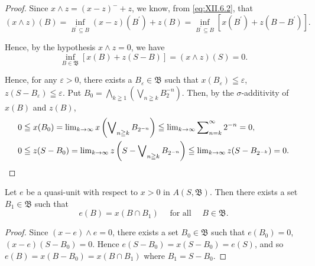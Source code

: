 \begin{proof}
 Since $x \wedge z = (x - z)^{-} + z$, we know, from \eqref{eq:XII.6.2}, that 
\begin{equation}\label{eq:XII.6.3}
(x \wedge z) (B) = \inf\limits _ {B ^{\prime} \subseteq B} (x - z) \left(B ^{\prime}\right) + z (B) = \inf\limits _ {B ^{\prime} \subseteq B} \left[ x \left(B ^{\prime}\right) + z \left(B - B ^{\prime}\right) \right]. \end{equation}

Hence, by the hypothesis $x \wedge z = 0$, we have 
\[
\inf\limits _ {B \in \mathfrak {B}} [ x (B) + z (S - B) ] = (x \wedge z) (S) = 0.
\]

Hence, for any $\varepsilon > 0$, there exists a $B_{\varepsilon} \in \mathfrak{B}$ such that $x(B_{\varepsilon}) \leqq \varepsilon$, $z(S - B_{\varepsilon}) \leqq \varepsilon$. Put $B_0 = \bigwedge\limits_{k \geqq 1} \left( \bigvee\limits_{n \geqq k} B_2^{-n} \right)$. Then, by the $\sigma$-additivity of $x(B)$ and $z(B)$, 
\begin{align}
0& \leqq x (B _{0}) = \lim\limits _{k \rightarrow \infty} x \left(\bigvee\limits_{n \geqq k} B _ {2 ^{-n}}\right) \leqq \lim\limits _{k \rightarrow \infty} \sum\limits_{n=k} ^{\infty} 2 ^{-n} = 0, \notag \\
0& \leqq z (S - B _{0}) = \lim\limits _{k \rightarrow \infty} z \left(S - \bigvee\limits_{n \geqq k} B _ {2 ^{-n}}\right) \leqq \lim\limits _{k \rightarrow \infty} z (S - B _ {2 ^{-k}}) = 0. \notag
\end{align}
\end{proof}

\begin{corollaryu} Let $e$ be a quasi-unit with respect to $x > 0$ in $A(S, \mathfrak{B})$. Then there exists a set $B_{1} \in \mathfrak{B}$ such that 
\begin{equation}\label{eq:XII.6.4}
e (B) = x \left(B \cap B _{1}\right) \quad \text{ for all } \quad B \in \mathfrak {B}.
\end{equation}
\end{corollaryu}

\begin{proof}
 Since $(x - e) \wedge e = 0$, there exists a set $B_0 \in \mathfrak{B}$ such that $e(B_0) = 0$, $(x - e)(S - B_0) = 0$. Hence $e(S - B_0) = x(S - B_0) = e(S)$, and so $e(B) = x(B - B_0) = x(B \cap B_1)$ where $B_1 = S - B_0$. 
\end{proof}

